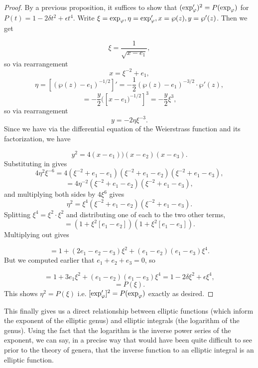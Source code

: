 \begin{proof}
    By a previous proposition, it suffices to show that $(\exp_\varphi ')^2 = P(\exp_\varphi)$ for $P(t) = 1 - 2 \delta t^2 + \epsilon t^4 $. Write $\xi  = \exp_\varphi, \eta = \exp_\varphi', x = \wp(z), y = \wp'(z)$. Then we get


\[ \xi = \frac{1}{\sqrt{x - e_1}}, \] 
so via rearrangement
\[x = \xi^{-2} + e_1, \]
\[\eta = [(\wp(z) - e_1)^{-1/2}]' =  -\frac{1}{2} (\wp(z) - e_1)^{-3/2} \cdot \wp'(z),\]
\[  = -\frac{y}{2} ([x-e_1)^{-1/2}]^3 = - \frac{y}{2} \xi^3,\]
so via rearrangement
\[ y = -2 \eta \xi^{-3}.\]
Since we have via the differential equation of the Weierstrass function and its factorization, we have

\[y^2 = 4(x - e_1))(x - e_2)(x - e_3).\]
Substituting in gives
\[ 4 \eta^2 \xi^{-6} = 4 (\xi^{-2} + e_1 - e_1)(\xi^{-2} + e_1 - e_2) (\xi^{-2} + e_1 - e_3),\]
\[ = 4 \eta^{-2} (\xi^{-2} + e_1 - e_2) (\xi^{-2} + e_1 - e_3), \]
and multiplying both sides by $4 \xi^6$ gives
\[ \eta^2 = \xi^4 (\xi^{-2} + e_1 - e_2) (\xi^{-2} + e_1 - e_3). \]
Splitting $\xi^4 = \xi^2 \cdot \xi^2$ and distributing one of each to the two other terms, 
\[ = (1 + \xi^2 [e_1 - e_2] ) (1 + \xi^2 [e_1 - e_3]).\]
Multiplying out gives

\[ = 1 + (2 e_1 - e_2 - e_3) \xi^2 + (e_1  -e_2)(e_1 - e_3) \xi^4.\]
But we computed earlier that $e_1 + e_2 + e_3 = 0$, so

\[ = 1 + 3 e_1 \xi^2 + (e_1 - e_2)(e_1 - e_3) \xi^4 = 1 - 2 \delta \xi^2 + \epsilon \xi^4,\]
\[ = P(\xi).\]
This shows $\eta^2  = P(\xi)$ i.e. $[\exp_\varphi']^2 = P(\exp_\varphi)$ exactly as desired.
\end{proof}


This finally gives us a direct relationship between elliptic functions (which inform the exponent of the elliptic genus) and elliptic integrals (the logarithm of the genus). Using the fact that the logarithm is the inverse power series of the exponent, we can say, in a precise way that would have been quite difficult to see prior to the theory of genera, that the inverse function to an elliptic integral is an elliptic function.
